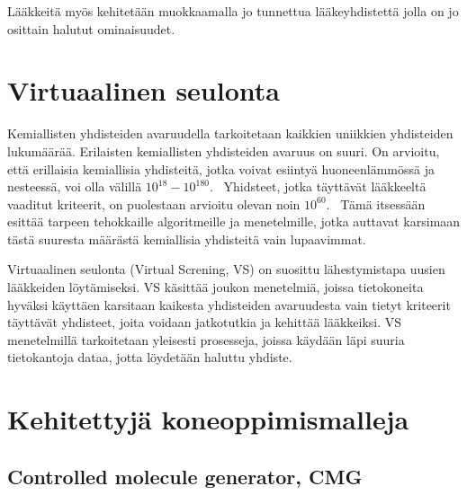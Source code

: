 \documentclass[finnish,twoside,censored,tkt,sw-line]{HYthesisML}
\begin{document}
Lääkkeitä myös kehitetään muokkaamalla jo tunnettua lääkeyhdistettä jolla on jo osittain halutut ominaisuudet.~\cite{ShaharHarelAndKiraRadinsky}


\section{Virtuaalinen seulonta}

Kemiallisten yhdisteiden avaruudella tarkoitetaan kaikkien uniikkien yhdisteiden lukumäärää.
Erilaisten kemiallisten yhdisteiden avaruus on suuri.
On arvioitu, että erillaisia kemiallisia yhdisteitä, jotka voivat esiintyä huoneenlämmössä ja nesteessä, voi olla välillä $10^{18} - 10^{180}$.~\cite{SotrifferChristoph2011VSPC}
Yhidsteet, jotka täyttävät lääkkeeltä vaaditut kriteerit, on puolestaan arvioitu olevan noin $10^{60}$.~\cite{SotrifferChristoph2011VSPC}
Tämä itsessään esittää tarpeen tehokkaille algoritmeille ja menetelmille, jotka auttavat karsimaan tästä suuresta määrästä kemiallisia yhdisteitä vain lupaavimmat.

Virtuaalinen seulonta (Virtual Screning, VS) on suosittu lähestymistapa uusien lääkkeiden löytämiseksi.
VS käsittää joukon menetelmiä, joissa tietokoneita hyväksi käyttäen karsitaan kaikesta yhdisteiden avaruudesta vain tietyt kriteerit täyttävät yhdisteet, joita voidaan jatkotutkia ja kehittää lääkkeiksi.
VS menetelmillä tarkoitetaan yleisesti prosesseja, joissa käydään läpi suuria tietokantoja dataa, jotta löydetään haluttu yhdiste.~\cite{SotrifferChristoph2011VSPC}



\section{Kehitettyjä koneoppimismalleja}


\subsection{Controlled molecule generator, CMG}
\end{document}
